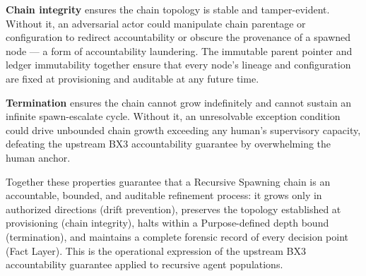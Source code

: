\medskip\textbf{Chain integrity} ensures the chain topology is stable and
tamper-evident.  Without it, an adversarial actor could manipulate chain
parentage or configuration to redirect accountability or obscure the provenance
of a spawned node --- a form of accountability laundering.  The immutable
parent pointer and ledger immutability together ensure that every node's
lineage and configuration are fixed at provisioning and auditable at any future
time.

\medskip\textbf{Termination} ensures the chain cannot grow indefinitely and
cannot sustain an infinite spawn-escalate cycle.  Without it, an unresolvable
exception condition could drive unbounded chain growth exceeding any human's
supervisory capacity, defeating the upstream BX3 accountability guarantee by
overwhelming the human anchor.

Together these properties guarantee that a Recursive Spawning chain is an
accountable, bounded, and auditable refinement process: it grows only in
authorized directions (drift prevention), preserves the topology established at
provisioning (chain integrity), halts within a Purpose-defined depth bound
(termination), and maintains a complete forensic record of every decision
point (Fact Layer).  This is the operational expression of the upstream BX3
accountability guarantee applied to recursive agent populations.
